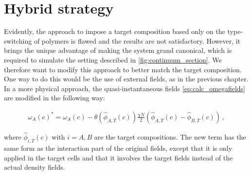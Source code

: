 \documentclass[bachelor,       %
               oneside,        %
               BCOR10mm,       %
               ngerman, english %
               ]{GAUBM}
\begin{document}
\section{Hybrid strategy}


Evidently, the approach to impose a target composition based only on the type-switching of polymers is flawed and the results are not satisfactory. However, it brings the unique advantage of making the system grand canonical, which is required to simulate the setting described in \autoref{fig:continuum_section}. We therefore want to modify this approach to better match the target composition. One way to do this would be the use of external fields, as in the previous chapter. In a more physical approach, the quasi-instantaneous fields \autoref{eq:calc_omegafields} are modified in the following way:

\begin{align}
    \omega_{A}(c)^*=\omega_{A}(c)-\theta(\hat{\phi}_{A,T}(c))\frac{\chi N}{2}\left(\hat\phi_{A,T}(c)-\hat\phi_{B,T}(c)\right)\,,
\end{align}

where $\hat\phi_{i,T}(c)$ with $i=A,B$ are the target compositions. The new term has the same form as the interaction part of the original fields, except that it is only applied in the target cells and that it involves the target fields instead of the actual density fields.




\end{document}
